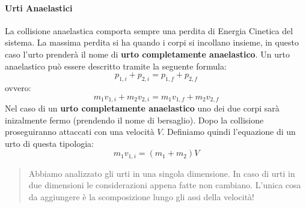         \paragraph{Urti Anaelastici} La collisione anaelastica comporta sempre
        una perdita di Energia Cinetica del sistema. La massima perdita si ha 
        quando i corpi si incollano insieme, in questo caso l'urto prenderà il 
        nome di \textbf{urto completamente anaelastico}.
        Un urto anaelastico può essere descritto tramite la seguente formula:
        \begin{equation}
            p_{1,i} + p_{2,i} = p_{1,f} + p_{2,f}
        \end{equation}
        ovvero:
        \begin{equation*}
            m_1v_{1,i} + m_2v_{2,i} = m_1v_{1,f} + m_2v_{2,f}
        \end{equation*}
        Nel caso di un \textbf{urto completamente anaelastico} uno dei due 
        corpi sarà inizalmente fermo (prendendo il nome di bersaglio). Dopo la 
        collisione proseguiranno attaccati con una velocità $V$. Definiamo 
        quindi l'equazione di un urto di questa tipologia:
        \begin{equation}
            m_1v_{1,i} = (m_1+m_2)V
        \end{equation} 
        \begin{quote}
            Abbiamo analizzato gli urti in una singola dimensione. In caso di 
            urti in due dimensioni le considerazioni appena fatte non cambiano.
            L'unica cosa da aggiungere è la scomposizione lungo gli assi della
            velocità!
        \end{quote}
        

